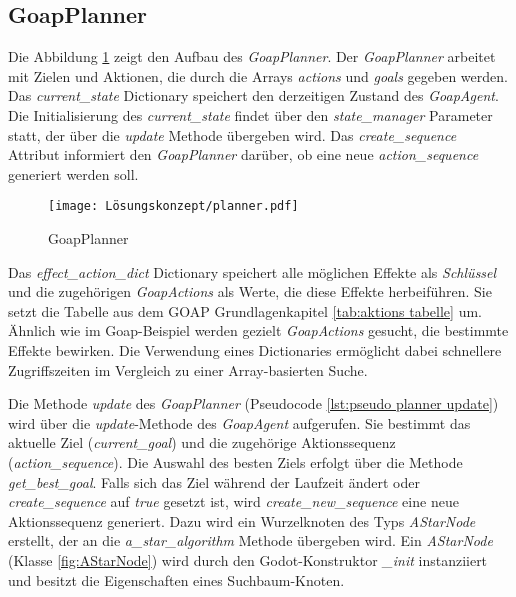 \subsection{GoapPlanner}
\label{chap:goapplanner uml}

Die Abbildung \ref{fig:goapplanner uml} zeigt den Aufbau des \textit{GoapPlanner}. Der \textit{GoapPlanner} arbeitet mit Zielen und Aktionen, die durch die Arrays \textit{actions} und \textit{goals} gegeben werden. Das \textit{current\_state} Dictionary speichert den derzeitigen Zustand des \textit{GoapAgent}. Die Initialisierung des \textit{current\_state} findet über den \textit{state\_manager} Parameter statt, der über die \textit{update} Methode übergeben wird. Das \textit{create\_sequence} Attribut informiert den \textit{GoapPlanner} darüber, ob eine neue \textit{action\_sequence} generiert werden soll. 

\begin{figure}[h]
  \centering
  \texttt{[image: Lösungskonzept/planner.pdf]}
	\captionsetup{justification=justified, format=plain}
  \caption{GoapPlanner}
  \label{fig:goapplanner uml}
\end{figure}

Das \textit{effect\_action\_dict} Dictionary speichert alle möglichen Effekte als \textit{Schlüssel} und die zugehörigen \textit{GoapActions} als Werte, die diese Effekte herbeiführen. Sie setzt die Tabelle aus dem GOAP Grundlagenkapitel \ref{tab:aktions tabelle} um. Ähnlich wie im Goap-Beispiel werden gezielt \textit{GoapActions} gesucht, die bestimmte Effekte bewirken. Die Verwendung eines Dictionaries ermöglicht dabei schnellere Zugriffszeiten im Vergleich zu einer Array-basierten Suche.

Die Methode \textit{update} des \textit{GoapPlanner} (Pseudocode \ref{lst:pseudo planner update}) wird über die \textit{update}-Methode des \textit{GoapAgent} aufgerufen. Sie bestimmt das aktuelle Ziel (\textit{current\_goal}) und die zugehörige Aktionssequenz (\textit{action\_sequence}). Die Auswahl des besten Ziels erfolgt über die Methode \textit{get\_best\_goal}. Falls sich das Ziel während der Laufzeit ändert oder \textit{create\_sequence} auf \textit{true} gesetzt ist, wird \textit{create\_new\_sequence} eine neue Aktionssequenz generiert. Dazu wird ein Wurzelknoten des Typs \textit{AStarNode} erstellt, der an die \textit{a\_star\_algorithm} Methode übergeben wird. Ein \textit{AStarNode} (Klasse \ref{fig:AStarNode}) wird durch den Godot-Konstruktor \textit{\_init} instanziiert und besitzt die Eigenschaften eines Suchbaum-Knoten.

